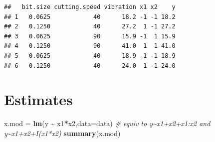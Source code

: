 \documentclass[
]{article}
\newenvironment{Shaded}{\begin{snugshade}}{\end{snugshade}}
\newcommand{\AttributeTok}[1]{\textcolor[rgb]{0.13,0.29,0.53}{#1}}
\newcommand{\CommentTok}[1]{\textcolor[rgb]{0.56,0.35,0.01}{\textit{#1}}}
\newcommand{\ControlFlowTok}[1]{\textcolor[rgb]{0.13,0.29,0.53}{\textbf{#1}}}
\newcommand{\DecValTok}[1]{\textcolor[rgb]{0.00,0.00,0.81}{#1}}
\newcommand{\FunctionTok}[1]{\textcolor[rgb]{0.13,0.29,0.53}{\textbf{#1}}}
\newcommand{\NormalTok}[1]{#1}
\newcommand{\OtherTok}[1]{\textcolor[rgb]{0.56,0.35,0.01}{#1}}
\newcommand{\SpecialCharTok}[1]{\textcolor[rgb]{0.81,0.36,0.00}{\textbf{#1}}}
\newcommand{\StringTok}[1]{\textcolor[rgb]{0.31,0.60,0.02}{#1}}
\begin{document}
\begin{Shaded}
\end{Shaded}

\begin{verbatim}
##   bit.size cutting.speed vibration x1 x2    y
## 1   0.0625            40      18.2 -1 -1 18.2
## 2   0.1250            40      27.2  1 -1 27.2
## 3   0.0625            90      15.9 -1  1 15.9
## 4   0.1250            90      41.0  1  1 41.0
## 5   0.0625            40      18.9 -1 -1 18.9
## 6   0.1250            40      24.0  1 -1 24.0
\end{verbatim}

\hypertarget{estimates}{%
\section{Estimates}\label{estimates}}

\begin{Shaded}
\begin{Highlighting}[]
\NormalTok{x.mod }\OtherTok{=} \FunctionTok{lm}\NormalTok{(y }\SpecialCharTok{\textasciitilde{}}\NormalTok{ x1}\SpecialCharTok{*}\NormalTok{x2,}\AttributeTok{data=}\NormalTok{data) }\CommentTok{\# equiv to y\textasciitilde{}x1+x2+x1:x2 and y\textasciitilde{}x1+x2+I(x1*x2)}
\FunctionTok{summary}\NormalTok{(x.mod)}
\end{Highlighting}
\end{Shaded}
\end{document}
